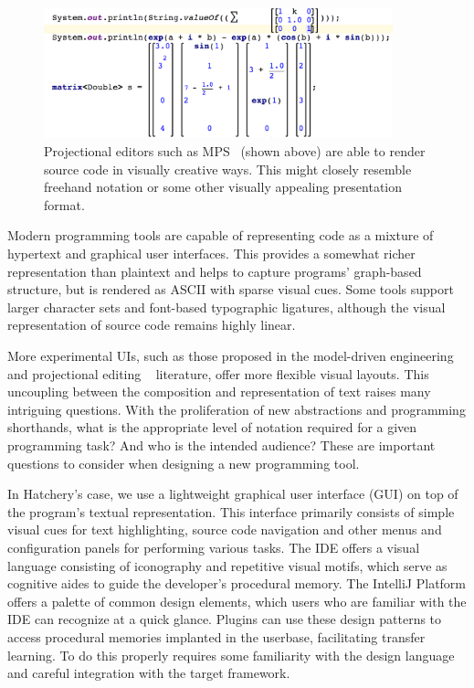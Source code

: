\documentclass[12pt,initial,twoside,maitrise]{dms}
\numberwithin{equation}{section}
\numberwithin{table}{chapter}
\numberwithin{figure}{chapter}
\begin{document}
\begin{figure}
    \centering
    \includegraphics[width=0.90\textwidth]{mps_screenshot.png}
    \caption{Projectional editors such as MPS~\citep{voelter2010language, pech2013jetbrains} (shown above) are able to render source code in visually creative ways. This might closely resemble freehand notation or some other visually appealing presentation format.}
    \label{fig:mps_screenshot}
\end{figure}

Modern programming tools are capable of representing code as a mixture of hypertext and graphical user interfaces. This provides a somewhat richer representation than plaintext and helps to capture programs' graph-based structure, but is rendered as ASCII with sparse visual cues. Some tools support larger character sets and font-based typographic ligatures, although the visual representation of source code remains highly linear.

More experimental UIs, such as those proposed in the model-driven engineering~\citep{famelis2015mummint} and projectional editing ~\citep{voelter2010language} literature, offer more flexible visual layouts. This uncoupling between the composition and representation of text raises many intriguing questions. With the proliferation of new abstractions and programming shorthands, what is the appropriate level of notation required for a given programming task? And who is the intended audience? These are important questions to consider when designing a new programming tool.

In Hatchery's case, we use a lightweight graphical user interface (GUI) on top of the program's textual representation. This interface primarily consists of simple visual cues for text highlighting, source code navigation and other menus and configuration panels for performing various tasks. The IDE offers a visual language consisting of iconography and repetitive visual motifs, which serve as cognitive aides to guide the developer's procedural memory. The IntelliJ Platform offers a palette of common design elements, which users who are familiar with the IDE can recognize at a quick glance. Plugins can use these design patterns to access procedural memories implanted in the userbase, facilitating transfer learning. To do this properly requires some familiarity with the design language and careful integration with the target framework.
\end{document}
